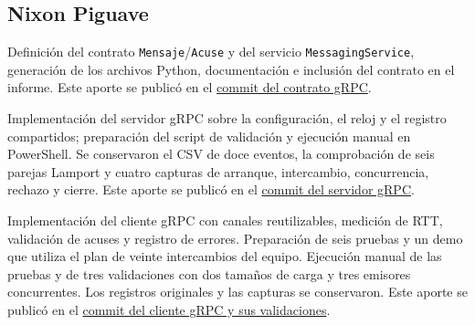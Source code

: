 \subsection{Nixon Piguave}
Definición del contrato \texttt{Mensaje}/\texttt{Acuse} y del servicio
\texttt{MessagingService}, generación de los archivos Python, documentación
e inclusión del contrato en el informe. Este aporte se publicó en el
\href{https://github.com/BelindaTZ/GA-SUM-02-PE-U1/commit/f550d0867ea31248a5ce76f064eab3ef250b8324}{commit del contrato gRPC}.

Implementación del servidor gRPC sobre la configuración, el reloj y el registro
compartidos; preparación del script de validación y ejecución manual en PowerShell.
Se conservaron el CSV de doce eventos, la comprobación de seis parejas Lamport
y cuatro capturas de arranque, intercambio, concurrencia, rechazo y cierre.
Este aporte se publicó en el
\href{https://github.com/BelindaTZ/GA-SUM-02-PE-U1/commit/e74e9196242ebde24689ba9ed4e9c9e7d0ca1b69}{commit del servidor gRPC}.

Implementación del cliente gRPC con canales reutilizables, medición de RTT,
validación de acuses y registro de errores. Preparación de seis pruebas y un
demo que utiliza el plan de veinte intercambios del equipo. Ejecución manual
de las pruebas y de tres validaciones con dos tamaños de carga y tres emisores
concurrentes. Los registros originales y las capturas se conservaron.
Este aporte se publicó en el
\href{https://github.com/BelindaTZ/GA-SUM-02-PE-U1/commit/3cd968bb3f04634f590dd557766cddafa71bb57b}{commit del cliente gRPC y sus validaciones}.
